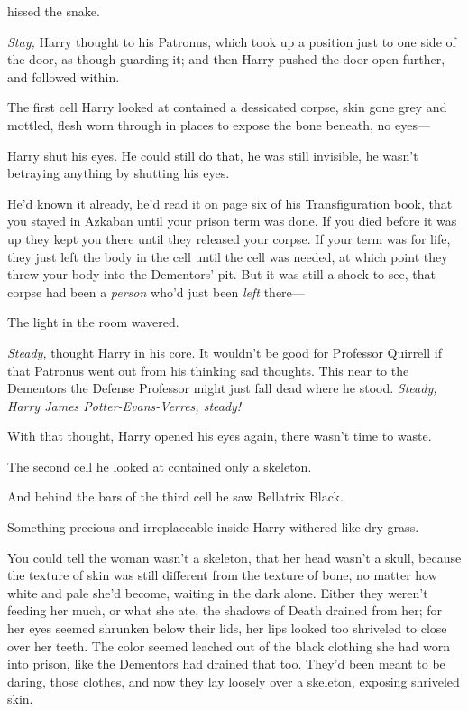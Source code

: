  hissed the snake.

\emph{Stay,} Harry thought to his Patronus, which took up a position just to
one side of the door, as though guarding it; and then Harry pushed the door
open further, and followed within.

The first cell Harry looked at contained a dessicated corpse, skin gone grey
and mottled, flesh worn through in places to expose the bone beneath, no eyes---

Harry shut his eyes. He could still do that, he was still invisible, he wasn't
betraying anything by shutting his eyes.

He'd known it already, he'd read it on page six of his Transfiguration book,
that you stayed in Azkaban until your prison term was done. If you died before
it was up they kept you there until they released your corpse. If your term was
for life, they just left the body in the cell until the cell was needed, at
which point they threw your body into the Dementors' pit. But it was still a
shock to see, that corpse had been a \emph{person} who'd just been \emph{left}
there---

The light in the room wavered.

\emph{Steady,} thought Harry in his core. It wouldn't be good for Professor
Quirrell if that Patronus went out from his thinking sad thoughts. This near to
the Dementors the Defense Professor might just fall dead where he stood.
\emph{Steady, Harry James Potter-Evans-Verres, steady!}

With that thought, Harry opened his eyes again, there wasn't time to waste.

The second cell he looked at contained only a skeleton.

And behind the bars of the third cell he saw Bellatrix Black.

Something precious and irreplaceable inside Harry withered like dry grass.

You could tell the woman wasn't a skeleton, that her head wasn't a skull,
because the texture of skin was still different from the texture of bone, no
matter how white and pale she'd become, waiting in the dark alone. Either they
weren't feeding her much, or what she ate, the shadows of Death drained from
her; for her eyes seemed shrunken below their lids, her lips looked too
shriveled to close over her teeth. The color seemed leached out of the black
clothing she had worn into prison, like the Dementors had drained that too.
They'd been meant to be daring, those clothes, and now they lay loosely over a
skeleton, exposing shriveled skin.


